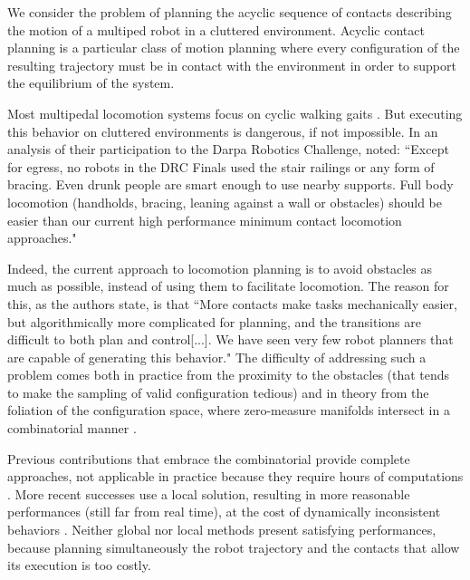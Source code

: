 We consider the problem of planning the  acyclic sequence of contacts describing the motion of a multiped robot in a cluttered environment. Acyclic contact planning is a particular class of motion planning where every configuration of the resulting trajectory must be in contact with the environment in order to support  the equilibrium of the system.

Most multipedal locomotion systems focus on cyclic walking gaits \citep{Kajita03a}. But  executing
this behavior on cluttered environments is dangerous, if not impossible.
In an analysis of their participation to the Darpa Robotics Challenge, \citeauthor{atkensondarpa}
noted: ``Except for egress, no robots in the DRC Finals used
the  stair  railings  or  any  form  of  bracing.   Even  drunk  people  are  smart  enough  to  use  nearby  supports.
Full body locomotion (handholds,  bracing,  leaning against a wall or obstacles) should be easier than our
current high performance minimum contact locomotion approaches."

Indeed, the current approach to locomotion planning is to avoid obstacles as much as possible, instead of using them
to facilitate locomotion. The reason for this, as the authors state, is that ``More contacts make tasks
mechanically easier, but algorithmically more complicated for planning, and the transitions are difficult to
both plan and control[...].  We have seen very few robot planners that are  capable of  generating this  behavior."
The difficulty of addressing such a problem comes both in practice from the proximity to the obstacles (that tends to make the sampling of valid  configuration tedious) and in theory from the foliation of the configuration space, where zero-measure manifolds intersect in a combinatorial manner \citep{simeon-manipulation-04}.

Previous contributions that embrace the combinatorial provide complete approaches, not applicable in practice because they require hours of computations \citep{conf/iser/BretlRLKA04}.
More recent successes use a local solution, resulting in more reasonable performances  (still far from real time), at the cost of dynamically inconsistent behaviors \citep{Mordatch:2012:DCB:2185520.2185539}.
Neither global nor local methods present satisfying performances, because planning simultaneously the robot trajectory and the contacts that allow
its execution is too costly. 

